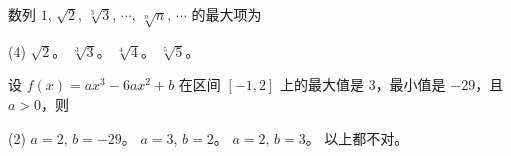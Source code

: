 \begin{ti}
	数列 $1$, $\sqrt{2}$, $\sqrt[3]{3}$, $\cdots$, $\sqrt[n]{n}$, $\cdots$ 的最大项为
	\begin{tasks}(4)
		\task $\sqrt{2}$。
		\task $\sqrt[3]{3}$。
		\task $\sqrt[4]{4}$。
		\task $\sqrt[5]{5}$。
	\end{tasks}
\end{ti}

\begin{ti}
	设 $f(x) = ax^3 - 6ax^2 + b$ 在区间 $[-1,2]$ 上的最大值是 $3$，最小值是 $-29$，且 $a>0$，则
	\begin{tasks}(2)
		\task $a=2$, $b=-29$。
		\task $a=3$, $b=2$。
		\task $a=2$, $b=3$。
		\task 以上都不对。
	\end{tasks}
\end{ti}